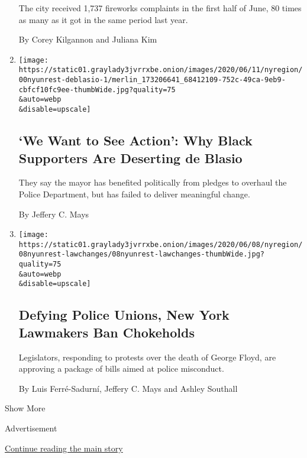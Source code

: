 \begin{enumerate}
  The city received 1,737 fireworks complaints in the first half of
  June, 80 times as many as it got in the same period last year.

  By Corey Kilgannon and Juliana Kim
\item
  \href{/2020/06/12/nyregion/de-blasio-blacks-protest.html}{}

  \texttt{[image: https://static01.graylady3jvrrxbe.onion/images/2020/06/11/nyregion/00nyunrest-deblasio-1/merlin\_173206641\_68412109-752c-49ca-9eb9-cbfcf10fc9ee-thumbWide.jpg?quality=75\\\&auto=webp\\\&disable=upscale]}

  \hypertarget{we-want-to-see-action-why-black-supporters-are-deserting-de-blasio}{%
  \subsection{`We Want to See Action': Why Black Supporters Are
  Deserting de
  Blasio}\label{we-want-to-see-action-why-black-supporters-are-deserting-de-blasio}}

  They say the mayor has benefited politically from pledges to overhaul
  the Police Department, but has failed to deliver meaningful change.

  By Jeffery C. Mays
\item
  \href{/2020/06/08/nyregion/floyd-protests-police-reform.html}{}

  \texttt{[image: https://static01.graylady3jvrrxbe.onion/images/2020/06/08/nyregion/08nyunrest-lawchanges/08nyunrest-lawchanges-thumbWide.jpg?quality=75\\\&auto=webp\\\&disable=upscale]}

  \hypertarget{defying-police-unions-new-york-lawmakers-ban-chokeholds}{%
  \subsection{Defying Police Unions, New York Lawmakers Ban
  Chokeholds}\label{defying-police-unions-new-york-lawmakers-ban-chokeholds}}

  Legislators, responding to protests over the death of George Floyd,
  are approving a package of bills aimed at police misconduct.

  By Luis Ferré-Sadurní, Jeffery C. Mays and Ashley Southall
\end{enumerate}

Show More

Advertisement

\protect\hyperlink{after-mid2}{Continue reading the main story}

